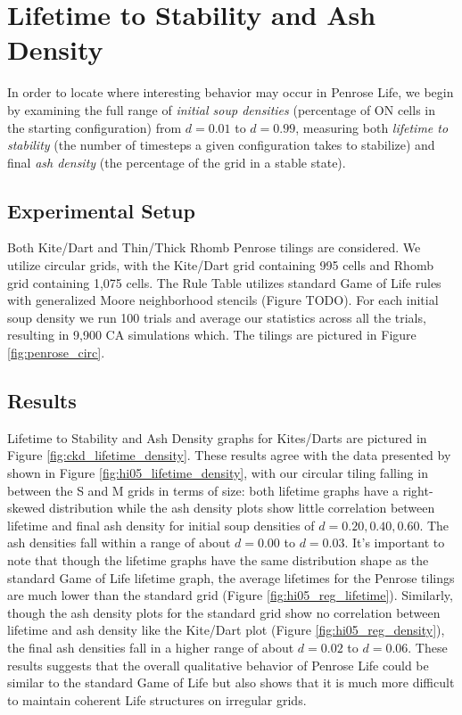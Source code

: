 \documentclass[a4paper,11pt]{report}
\begin{document}
\section{Lifetime to Stability and Ash Density}

In order to locate where interesting behavior may occur in Penrose Life, we begin by examining the full range of \textit{initial soup densities} (percentage of ON cells in the starting configuration) from $d=0.01$ to $d=0.99$, measuring both \textit{lifetime to stability} (the number of timesteps a given configuration takes to stabilize) and final \textit{ash density} (the percentage of the grid in a stable state).

\subsection{Experimental Setup}
Both Kite/Dart and Thin/Thick Rhomb Penrose tilings are considered. We utilize circular grids, with the Kite/Dart grid containing 995 cells and Rhomb grid containing 1,075 cells. The Rule Table utilizes standard Game of Life rules with generalized Moore neighborhood stencils (Figure TODO). For each initial soup density we run 100 trials and average our statistics across all the trials, resulting in 9,900 CA simulations which. The tilings are pictured in Figure \ref{fig:penrose_circ}.

\subsection{Results}
Lifetime to Stability and Ash Density graphs for Kites/Darts are pictured in Figure \ref{fig:ckd_lifetime_density}. These results agree with the data presented by \citeauthor{hi05} shown in Figure \ref{fig:hi05_lifetime_density}, with our circular tiling falling in between the S and M grids in terms of size: both lifetime graphs have a right-skewed distribution while the ash density plots show little correlation between lifetime and final ash density for initial soup densities of $d=0.20, 0.40, 0.60$. The ash densities fall within a range of about $d=0.00$ to $d=0.03$. It's important to note that though the lifetime graphs have the same distribution shape as the standard Game of Life lifetime graph, the average lifetimes for the Penrose tilings are much lower than the standard grid (Figure \ref{fig:hi05_reg_lifetime}). Similarly, though the ash density plots for the standard grid show no correlation between lifetime and ash density like the Kite/Dart plot (Figure \ref{fig:hi05_reg_density}), the final ash densities fall in a higher range of about $d=0.02$ to $d=0.06$. These results suggests that the overall qualitative behavior of Penrose Life could be similar to the standard Game of Life but also shows that it is much more difficult to maintain coherent Life structures on irregular grids.
\end{document}
